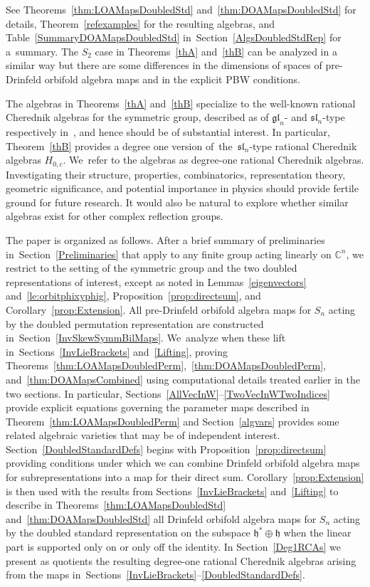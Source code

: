 \documentclass[10pt,a4paper]{amsart}
\numberwithin{equation}{section}
\begin{document}
See Theorems~\ref{thm:LOAMapsDoubledStd} and~\ref{thm:DOAMapsDoubledStd}
for details, Theorem~\ref{refexamples} for the resulting algebras,
and Table~\ref{SummaryDOAMapsDoubledStd} in~Section~\ref{AlgsDoubledStdRep} for a~summary.
The $S_2$ case in Theorems~\ref{thA} and~\ref{thB} can be analyzed in a similar way but there are some
differences in the dimensions of spaces of pre-Drinfeld orbifold algebra maps and
in the explicit PBW conditions.

The algebras in Theorems~\ref{thA} and~\ref{thB} specialize
to the well-known rational Cherednik algebras for the symmetric group,
described as of $\mathfrak{gl}_n$- and $\mathfrak{sl}_n$-type respectively
in~\cite{GanGinzburg2006}, and hence should be of substantial interest.
In particular, Theorem~\ref{thB}
provides a degree one version of~the~$\mathfrak{sl}_n$-type rational Cherednik
algebras $H_{0,c}$. We~refer to the algebras as degree-one rational Cherednik algebras.
Investigating their structure, properties, combinatorics, representation theory,
geometric significance, and potential importance in physics
should provide fertile ground for future research. It would also be natural
to explore whether similar algebras exist for other complex reflection groups.

The paper is organized as follows.
After a brief summary of preliminaries in~Section~\ref{Preliminaries}
that apply to any finite group acting linearly on $\mathbb{C}^n$, we restrict
to the setting of the symmetric group and the two doubled representations
of interest, except as noted in Lemmas~\ref{eigenvectors} and~\ref{le:orbitphixyphig}, Proposition~\ref{prop:directsum},
and Corollary~\ref{prop:Extension}.
All pre-Drinfeld orbifold algebra maps for $S_n$ acting by the doubled
permutation representation are constructed in~Section~\ref{InvSkewSymmBilMaps}. We~analyze when these lift in~Sections~\ref{InvLieBrackets} and~\ref{Lifting}, proving Theorems~\ref{thm:LOAMapsDoubledPerm},~\ref{thm:DOAMapsDoubledPerm},
and~\ref{thm:DOAMapsCombined} using computational details treated
earlier in the two sections.
In particular, Sections~\ref{AllVecInW}--\ref{TwoVecInWTwoIndices} provide
explicit equations governing the parameter maps described in
Theorem~\ref{thm:LOAMapsDoubledPerm} and Section~\ref{algvars} provides some related
algebraic varieties that may be of independent interest.
Section~\ref{DoubledStandardDefs} begins with Proposition~\ref{prop:directsum} providing conditions under which we can combine Drinfeld orbifold algebra maps for subrepresentations into a map for their direct sum.
Corollary~\ref{prop:Extension} is then used with the results from
Sections~\ref{InvLieBrackets} and~\ref{Lifting} to describe in Theorems~\ref{thm:LOAMapsDoubledStd}
and~\ref{thm:DOAMapsDoubledStd} all Drinfeld orbifold algebra maps
for $S_n$ acting by the doubled standard representation on the subspace
$\mathfrak{h}^* \oplus \mathfrak{h}$ when the linear part is supported only on or only off
the identity. In Section~\ref{Deg1RCAs} we present as quotients
the resulting degree-one rational Cherednik algebras arising from the maps in~Sections~\ref{InvLieBrackets}--\ref{DoubledStandardDefs}.
\end{document}
